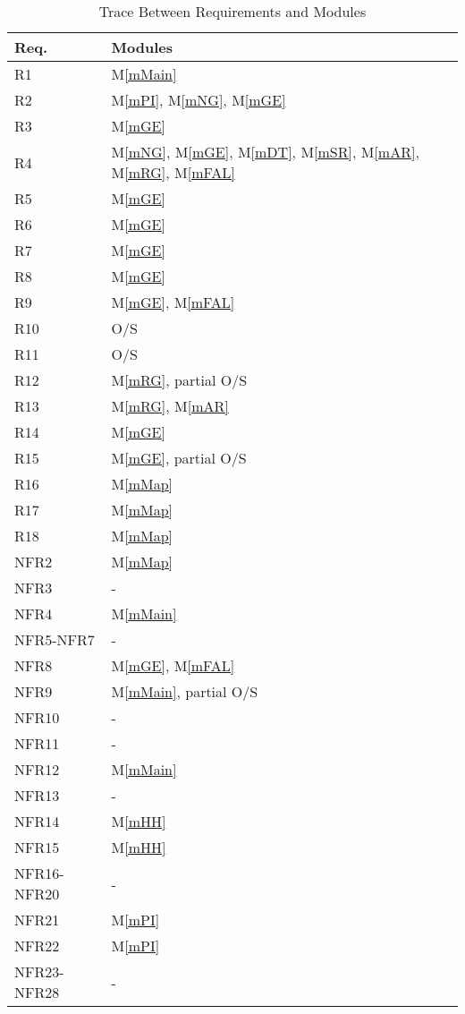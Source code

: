 \documentclass[12pt, titlepage]{article}
\newcommand{\mref}[1]{M\ref{#1}}
\begin{document}
\begin{table}[H]
\centering
\begin{tabular}{p{} p{}}
\toprule
\textbf{Req.} & \textbf{Modules}\\
\midrule
R1 & \mref{mMain}\\
R2 & \mref{mPI}, \mref{mNG}, \mref{mGE}\\
R3 & \mref{mGE}\\
R4 & \mref{mNG}, \mref{mGE}, \mref{mDT}, \mref{mSR}, \mref{mAR}, \mref{mRG}, \mref{mFAL}\\
R5 & \mref{mGE}\\
R6 & \mref{mGE}\\
R7 & \mref{mGE}\\
R8 & \mref{mGE}\\
R9 & \mref{mGE}, \mref{mFAL}\\
R10 & O/S\\
R11 & O/S\\
R12 & \mref{mRG}, partial O/S\\
R13 & \mref{mRG}, \mref{mAR}\\
R14 & \mref{mGE}\\
R15 & \mref{mGE}, partial O/S\\
R16 & \mref{mMap}\\
R17 & \mref{mMap}\\
R18 & \mref{mMap}\\
NFR2 & \mref{mMap}\\
NFR3 & -\\
NFR4 & \mref{mMain}\\
NFR5-NFR7 & -\\
NFR8 & \mref{mGE}, \mref{mFAL}\\
NFR9 & \mref{mMain}, partial O/S\\
NFR10 & - \\
NFR11 & -\\
NFR12 & \mref{mMain}\\
NFR13 & -\\
NFR14 & \mref{mHH}\\
NFR15 & \mref{mHH}\\
NFR16-NFR20 & -\\
NFR21 & \mref{mPI}\\
NFR22 & \mref{mPI}\\
NFR23-NFR28 & -\\
\bottomrule
\end{tabular}
\caption{Trace Between Requirements and Modules}
\label{TblRT}
\end{table}
\end{document}
